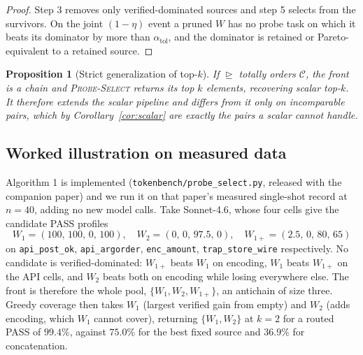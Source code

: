 \documentclass[11pt]{article}
\theoremstyle{plain}
\newtheorem{proposition}{Proposition}
\theoremstyle{definition}
\theoremstyle{remark}
\newcommand{\Ccal}{\mathcal{C}}
\begin{document}
\begin{proof}
Step 3 removes only verified-dominated sources and step 5 selects from the survivors. On the joint
$(1-\eta)$ event a pruned $W$ has no probe task on which it beats its dominator by more than
$\alpha_{\mathrm{tol}}$, and the dominator is retained or Pareto-equivalent to a retained source.
\end{proof}

\begin{proposition}[Strict generalization of top-$k$]\label{prop:generalize}
If $\trianglerighteq$ totally orders $\Ccal$, the front is a chain and \textsc{Probe-Select}
returns its top $k$ elements, recovering scalar top-$k$. It therefore extends the scalar pipeline
and differs from it only on incomparable pairs, which by Corollary~\ref{cor:scalar} are exactly the
pairs a scalar cannot handle.
\end{proposition}

\subsection{Worked illustration on measured data}
\label{sec:illustration}

Algorithm 1 is implemented (\texttt{tokenbench/probe\_select.py}, released with the companion
paper) and we run it on that paper's measured single-shot record at $n=40$, adding no new model
calls. Take Sonnet-4.6, whose four cells give the candidate PASS profiles
\[
  W_1 = (100,\,100,\,0,\,100), \quad
  W_2 = (0,\,0,\,97.5,\,0), \quad
  W_{1+} = (2.5,\,0,\,80,\,65)
\]
on \texttt{api\_post\_ok}, \texttt{api\_argorder}, \texttt{enc\_amount},
\texttt{trap\_store\_wire} respectively. No candidate is verified-dominated: $W_{1+}$ beats $W_1$
on encoding, $W_1$ beats $W_{1+}$ on the API cells, and $W_2$ beats both on encoding while losing
everywhere else. The front is therefore the whole pool, $\{W_1, W_2, W_{1+}\}$, an antichain of
size three. Greedy coverage then takes $W_1$ (largest verified gain from empty) and $W_2$ (adds
encoding, which $W_1$ cannot cover), returning $\{W_1, W_2\}$ at $k=2$ for a routed PASS of
$99.4\%$, against $75.0\%$ for the best fixed source and $36.9\%$ for concatenation.
\end{document}

